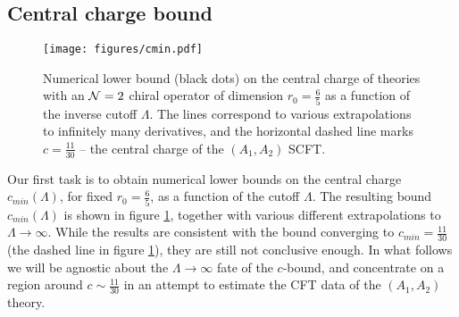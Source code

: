 \subsection{Central charge bound}
\label{sec:cbound}

\begin{figure}[htbp!]
             \begin{center}           
              \texttt{[image: figures/cmin.pdf]}
              \caption{Numerical lower bound (black dots) on the central charge of theories with an ${\mathcal{N}}=2$ chiral operator of dimension $r_{0}=\frac65$ as a function of the inverse cutoff $\Lambda$. The lines correspond to various extrapolations to infinitely many derivatives, and the horizontal dashed line marks $c=\tfrac{11}{30}$ -- the central charge of the $(A_1,A_2)$ SCFT.}
              \label{Fig:c_min}
            \end{center}
\end{figure}
%
Our first task is to obtain numerical lower bounds on the central charge $c_{min}(\Lambda)$, for fixed $r_0=\frac65$, as a function of the cutoff $\Lambda$.
The resulting bound $c_{min}(\Lambda)$ is shown in figure \ref{Fig:c_min}, together with various different extrapolations to $\Lambda \to \infty$. 
While the results are consistent with the bound converging to $c_{min}=\tfrac{11}{30}$ (the dashed line in figure \ref{Fig:c_min}), they are still not conclusive enough. In what follows we will be agnostic about the $\Lambda \to \infty$ fate of the $c$-bound, and concentrate on a region around $c\sim\tfrac{11}{30}$ in an attempt to estimate the CFT data of the $(A_1,A_2)$ theory.


